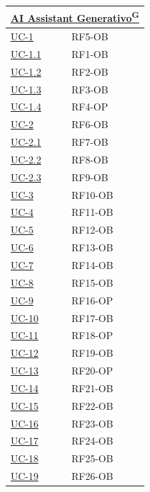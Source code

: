 ﻿\documentclass[a4paper,12pt]{article}
\providecommand{\glslink}[2]{\href{https://alittlebyte-19.github.io/Documentazione/glossario.html\#gls-#1}{\underline{#2}\textsuperscript{\scriptsize G}}}
\begin{document}
{\begin{longtable}{|p{4cm}|p{4cm}|}
    \multicolumn{2}{|l|}{\cellcolor{gray!12}\textbf{\glslink{ai-assistant-generativo}{AI Assistant Generativo}}} \\
    \hline
    \hyperref[fig:uc-1]{UC-1} & RF5-OB \\
    \hline
    \hyperref[fig:uc-1.1]{UC-1.1} & RF1-OB \\
    \hline
    \hyperref[fig:uc-1.2]{UC-1.2} & RF2-OB \\
    \hline
    \hyperref[fig:uc-1.3]{UC-1.3} & RF3-OB \\
    \hline
    \hyperref[fig:uc-1.4]{UC-1.4} & RF4-OP \\
    \hline
    \hyperref[fig:uc-2]{UC-2} & RF6-OB \\
    \hline
    \hyperref[fig:uc-2.1]{UC-2.1} & RF7-OB \\
    \hline
    \hyperref[fig:uc-2.2]{UC-2.2} & RF8-OB \\
    \hline
    \hyperref[fig:uc-2.3]{UC-2.3} & RF9-OB \\
    \hline
    \hyperref[fig:uc-3]{UC-3} & RF10-OB \\
    \hline
    \hyperref[fig:uc-4]{UC-4} & RF11-OB \\
    \hline
    \hyperref[fig:uc-5]{UC-5} & RF12-OB \\
    \hline
    \hyperref[fig:uc-6]{UC-6} & RF13-OB \\
    \hline
    \hyperref[fig:uc-7]{UC-7} & RF14-OB \\
    \hline
    \hyperref[fig:uc-8]{UC-8} & RF15-OB \\
    \hline
    \hyperref[fig:uc-9]{UC-9} & RF16-OP \\
    \hline
    \hyperref[fig:uc-10]{UC-10} & RF17-OB \\
    \hline
    \hyperref[fig:uc-11]{UC-11} & RF18-OP \\
    \hline
    \hyperref[fig:uc-12]{UC-12} & RF19-OB \\
    \hline
    \hyperref[fig:uc-13]{UC-13} & RF20-OP \\
    \hline
    \hyperref[fig:uc-14]{UC-14} & RF21-OB \\
    \hline
    \hyperref[fig:uc-15]{UC-15} & RF22-OB \\
    \hline
    \hyperref[fig:uc-16]{UC-16} & RF23-OB \\
    \hline
    \hyperref[fig:uc-17]{UC-17} & RF24-OB \\
    \hline
    \hyperref[fig:uc-18]{UC-18} & RF25-OB \\
    \hline
    \hyperref[fig:uc-19]{UC-19} & RF26-OB \\

\end{longtable}}
\end{document}
